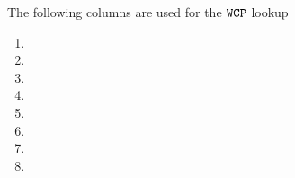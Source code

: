 The following columns are used for the $\texttt{WCP}$ lookup
\begin{multicols}{2}
    \begin{enumerate}[resume]
        \item \wcpFlag
        \item \wcpArgOneHi
        \item \wcpArgOneLo
        \item \wcpArgTwoHi
        \item \wcpArgTwoLo
        \item \wcpRes
        \item \wcpInst
        \item[\vspace{\fill}]
    \end{enumerate}
\end{multicols}
